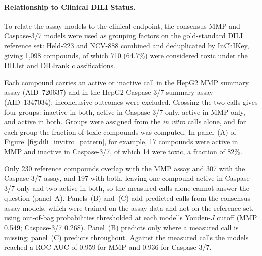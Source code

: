 \documentclass[letterpaper]{article}
\begin{document}
\paragraph{Relationship to Clinical DILI Status.}

To relate the assay models to the clinical endpoint, the consensus MMP and Caspase-3/7
models were used as grouping factors on the gold-standard DILI reference set:
Held-223 and NCV-888 combined and deduplicated by InChIKey, giving 1{,}098 compounds,
of which 710 (64.7\%) were considered toxic under the DILIst and DILIrank
classifications.

Each compound carries an active or inactive call in the HepG2 MMP summary assay
(AID~720637) and in the HepG2 Caspase-3/7 summary assay (AID~1347034); inconclusive
outcomes were excluded. Crossing the two calls gives four groups: inactive in both,
active in Caspase-3/7 only, active in MMP only, and active in both. Groups were
assigned from the \emph{in vitro} calls alone, and for each group the fraction of
toxic compounds was computed. In panel~(A) of
Figure~\ref{fig:dili_invitro_pattern}, for example, 17 compounds were active in MMP
and inactive in Caspase-3/7, of which 14 were toxic, a fraction of 82\%.

Only 230 reference compounds overlap with the MMP assay and 307 with the Caspase-3/7
assay, and 197 with both, leaving one compound active in Caspase-3/7 only and two
active in both, so the measured calls alone cannot answer the question (panel~A).
Panels~(B) and~(C) add predicted calls from the consensus assay models, which were
trained on the assay data and not on the reference set, using out-of-bag
probabilities thresholded at each model's Youden-$J$ cutoff (MMP 0.549; Caspase-3/7
0.268). Panel~(B) predicts only where a measured call is missing; panel~(C) predicts
throughout. Against the measured calls the models reached a ROC-AUC of 0.959 for MMP
and 0.936 for Caspase-3/7.
\end{document}
